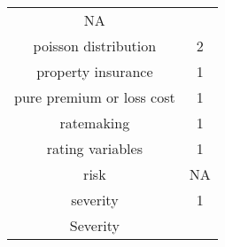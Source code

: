 \documentclass[]{book}
\theoremstyle{definition}
\theoremstyle{definition}
\theoremstyle{definition}
\theoremstyle{remark}
\begin{document}
\begin{longtable}[]{@{}cc@{}}
\begin{minipage}[t]{0.05\columnwidth}
NA\strut
\end{minipage}\tabularnewline
\begin{minipage}[t]{0.43\columnwidth}\centering\strut
poisson distribution\strut
\end{minipage} & \begin{minipage}[t]{0.05\columnwidth}\centering\strut
2\strut
\end{minipage}\tabularnewline
\begin{minipage}[t]{0.43\columnwidth}\centering\strut
property insurance\strut
\end{minipage} & \begin{minipage}[t]{0.05\columnwidth}\centering\strut
1\strut
\end{minipage}\tabularnewline
\begin{minipage}[t]{0.43\columnwidth}\centering\strut
pure premium or loss cost\strut
\end{minipage} & \begin{minipage}[t]{0.05\columnwidth}\centering\strut
1\strut
\end{minipage}\tabularnewline
\begin{minipage}[t]{0.43\columnwidth}\centering\strut
ratemaking\strut
\end{minipage} & \begin{minipage}[t]{0.05\columnwidth}\centering\strut
1\strut
\end{minipage}\tabularnewline
\begin{minipage}[t]{0.43\columnwidth}\centering\strut
rating variables\strut
\end{minipage} & \begin{minipage}[t]{0.05\columnwidth}\centering\strut
1\strut
\end{minipage}\tabularnewline
\begin{minipage}[t]{0.43\columnwidth}\centering\strut
risk\strut
\end{minipage} & \begin{minipage}[t]{0.05\columnwidth}\centering\strut
NA\strut
\end{minipage}\tabularnewline
\begin{minipage}[t]{0.43\columnwidth}\centering\strut
severity\strut
\end{minipage} & \begin{minipage}[t]{0.05\columnwidth}\centering\strut
1\strut
\end{minipage}\tabularnewline
\begin{minipage}[t]{0.43\columnwidth}\centering\strut
Severity\strut

\end{minipage}
\end{longtable}
\end{document}
